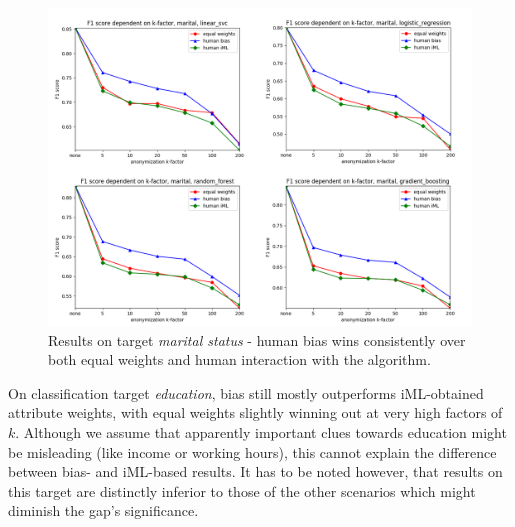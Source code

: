 \documentclass{llncs}
\begin{document}
\begin{figure}[!h]
	\begin{center}
		\hspace*{-0.8cm}
		\includegraphics[width=1.1\textwidth]{figures/marital_status.png}
		\caption{Results on target \textit{marital status} - human bias wins consistently over both equal weights and human interaction with the algorithm.}
		\label{fig:results_marital}
	\end{center}
\end{figure}


On classification target \textit{education}, bias still mostly outperforms iML-obtained attribute weights, with equal weights slightly winning out at very high factors of $k$. Although we assume that apparently important clues towards education might be misleading (like income or working hours), this cannot explain the difference between bias- and iML-based results. It has to be noted however, that results on this target are distinctly inferior to those of the other scenarios which might diminish the gap's significance.
\end{document}
